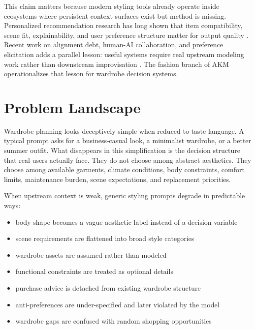 \documentclass[11pt]{article}
\begin{document}
This claim matters because modern styling tools already operate inside ecosystems where persistent context surfaces exist but method is missing. Personalized recommendation research has long shown that item compatibility, scene fit, explainability, and user preference structure matter for output quality \citep{lu2019binarycode,kang2019completelook,lu2021learnableanchors,sarkar2022outfittransformer,li2021personalizedtransformer,cheng2023erra,hsiao2018capsulewardrobes,salemi2023lamp}. Recent work on alignment debt, human-AI collaboration, and preference elicitation adds a parallel lesson: useful systems require real upstream modeling work rather than downstream improvisation \citep{white2023prompt,oyemike2025alignment,holstein2025thinking,foschini2025preference}. The fashion branch of AKM operationalizes that lesson for wardrobe decision systems.

\section{Problem Landscape}

Wardrobe planning looks deceptively simple when reduced to taste language. A typical prompt asks for a business-casual look, a minimalist wardrobe, or a better summer outfit. What disappears in this simplification is the decision structure that real users actually face. They do not choose among abstract aesthetics. They choose among available garments, climate conditions, body constraints, comfort limits, maintenance burden, scene expectations, and replacement priorities.

When upstream context is weak, generic styling prompts degrade in predictable ways:

\begin{itemize}[leftmargin=1.5em]
\item body shape becomes a vague aesthetic label instead of a decision variable
\item scene requirements are flattened into broad style categories
\item wardrobe assets are assumed rather than modeled
\item functional constraints are treated as optional details
\item purchase advice is detached from existing wardrobe structure
\item anti-preferences are under-specified and later violated by the model
\item wardrobe gaps are confused with random shopping opportunities
\end{itemize}
\end{document}
